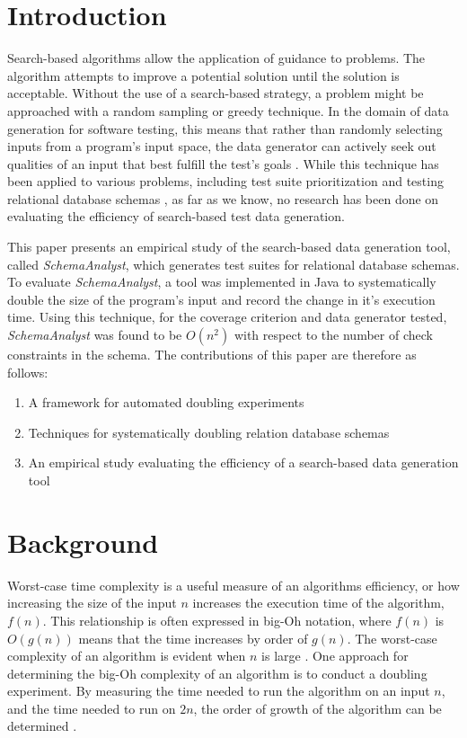 \documentclass[smallextended]{svjour3}       %
\begin{document}
\section{Introduction}
Search-based algorithms allow the application of guidance to problems.
The algorithm attempts to improve a potential solution until the
solution is acceptable. Without the use of a search-based strategy, a
problem might be approached with a random sampling or greedy
technique. In the
domain of data generation for software testing, this means that rather
than randomly selecting inputs from a program's input space, the data
generator can actively seek out qualities of an input that best fulfill
the test's goals \cite{McMinn2004a}. While this
technique has been applied to various problems, including test suite
prioritization \cite{Walcott:tsp} and testing
relational database schemas \cite{Kapfhammer2013}, 
as far as we know, no research has been done on evaluating the efficiency
of search-based test data generation. 

This paper presents an empirical study of the search-based data
generation tool, called \textit{SchemaAnalyst}, which generates test suites for
relational database schemas.  To evaluate \textit{SchemaAnalyst}, a tool
was implemented in Java to systematically double the size of the
program's input and record the change in it's execution time. Using this
technique, for the coverage criterion and data generator tested, 
\textit{SchemaAnalyst} was found to be $O(n^2)$ with respect
to the number of check constraints in the schema. The contributions of
this paper are therefore as follows:
\begin{enumerate}
  \item A framework for automated doubling experiments
  \item Techniques for systematically doubling relation database schemas
  \item An empirical study evaluating the efficiency of a search-based
    data generation tool
  \end{enumerate}

\section{Background}

Worst-case time complexity is a useful measure of an algorithms
efficiency, or how increasing the size
of the input $n$ increases the execution time of the algorithm, $f(n)$.
This relationship is often expressed in big-Oh notation, where $f(n)$
is $O(g(n))$ means that the time increases by order of $g(n)$. The
worst-case complexity of an algorithm is evident when $n$ is large 
\cite{Goodrich:Data}. One approach for determining the big-Oh complexity
of an algorithm is to conduct a doubling experiment. By measuring the
time needed to run the algorithm on an input $n$, and the time needed to
run on $2n$, the order of growth of the algorithm can be determined \cite{Mcgeoch:Algorithmics,Sedgewick:Analysis}. 
\end{document}
